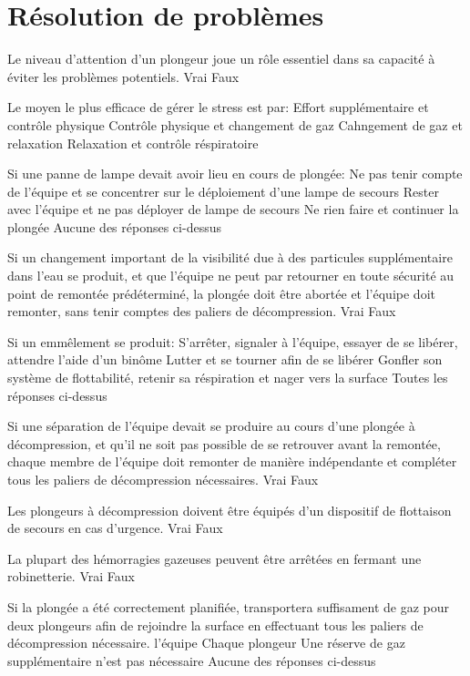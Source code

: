 \documentclass[english,12pt,a4paper]{article}
\begin{document}
	\section{Résolution de problèmes}
	\begin{outline}
		\1 Le niveau d'attention d'un plongeur joue un rôle essentiel dans sa capacité à éviter les problèmes potentiels.
			\2 Vrai
			\2 Faux

		\1 Le moyen le plus efficace de gérer le stress est par:
			\2 Effort supplémentaire et contrôle physique
			\2 Contrôle physique et changement de gaz
			\2 Cahngement de gaz et relaxation
			\2 Relaxation et contrôle réspiratoire

		\1 Si une panne de lampe devait avoir lieu en cours de plongée:
			\2 Ne pas tenir compte de l'équipe et se concentrer sur le déploiement d'une lampe de secours
			\2 Rester avec l'équipe et ne pas déployer de lampe de secours
			\2 Ne rien faire et continuer la plongée
			\1 Aucune des réponses ci-dessus

		\1 Si un changement important de la visibilité due à des particules supplémentaire dans l'eau se produit, et que l'équipe ne peut par retourner en toute sécurité au point de remontée prédéterminé, la plongée doit être abortée et l'équipe doit remonter, sans tenir comptes des paliers de décompression.
			\2 Vrai
			\2 Faux

		\1 Si un emmêlement se produit:
			\2 S'arrêter, signaler à l'équipe, essayer de se libérer, attendre l'aide d'un binôme
			\2 Lutter et se tourner afin de se libérer
			\2 Gonfler son système de flottabilité, retenir sa réspiration et nager vers la surface
			\2 Toutes les réponses ci-dessus

		\1 Si une séparation de l'équipe devait se produire au cours d'une plongée à décompression, et qu'il ne soit pas possible de se retrouver avant la remontée, chaque membre de l'équipe doit remonter de manière indépendante et compléter tous les paliers de décompression nécessaires.
			\2 Vrai
			\2 Faux

		\1 Les plongeurs à décompression doivent être équipés d'un dispositif de flottaison de secours en cas d'urgence. 
			\2 Vrai
			\2 Faux

		\1 La plupart des hémorragies gazeuses peuvent être arrêtées en fermant une robinetterie.
			\2 Vrai
			\2 Faux

		\1 Si la plongée a été correctement planifiée, \underline{\hspace{1.5cm}} transportera suffisament de gaz pour deux plongeurs afin de rejoindre la surface en effectuant tous les paliers de décompression nécessaire.
			\2 l'équipe
			\2 Chaque plongeur
			\2 Une réserve de gaz supplémentaire n'est pas nécessaire
			\2 Aucune des réponses ci-dessus


\end{outline}
\end{document}
